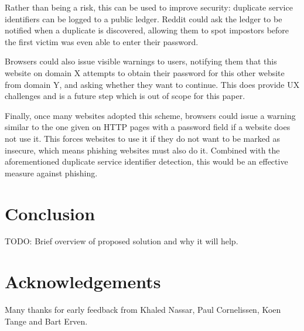 \documentclass{paper}
\begin{document}
Rather than being a risk, this can be used to improve security: duplicate service
identifiers can be logged to a public ledger. Reddit could ask the ledger to be notified when
a duplicate is discovered, allowing them to spot impostors before the first victim was even
able to enter their password.

Browsers could also issue visible warnings to users, notifying them that this website on
domain X attempts to obtain their password for this other website from domain Y, and asking
whether they want to continue. This does provide UX challenges and is a future step which is
out of scope for this paper.

Finally, once many websites adopted this scheme, browsers could issue a warning similar to
the one given on HTTP pages with a password field if a website does not use it. This forces
websites to use it if they do not want to be marked as insecure, which means phishing
websites must also do it. Combined with the aforementioned duplicate service identifier
detection, this would be an effective measure against phishing.

\section*{Conclusion}

TODO: Brief overview of proposed solution and why it will help.

\section*{Acknowledgements}

Many thanks for early feedback from Khaled Nassar, Paul Cornelissen, Koen Tange and Bart Erven.
\end{document}
